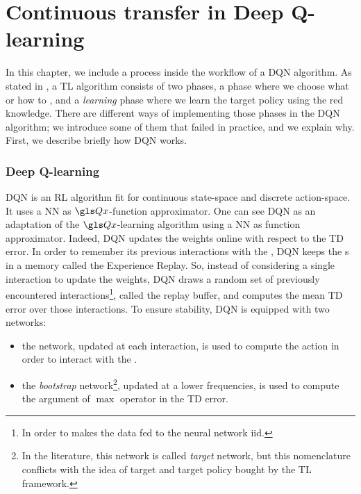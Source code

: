 
\chapter{Continuous transfer in Deep Q-learning}
\label{sec:continuous}

In this chapter, we include a  process inside the workflow of a \acrfull{DQN} algorithm. As stated in , a \acrfull{TL} algorithm consists of two phases, a \textit{} phase where we choose what or how to , and a \textit{learning} phase where we learn the target policy using the red knowledge. There are different ways of implementing those phases in the \gls{DQN} algorithm; we introduce some of them that failed in practice, and we explain why. First, we describe briefly how \gls{DQN} works.


\subsection{Deep Q-learning} \gls{DQN} is an  \acrfull{RL} algorithm fit for continuous state-space and discrete action-space. It uses a \acrfull{NN} as $\Q$-function approximator. One can see \gls{DQN} as an adaptation of the $\Q$-learning algorithm using a \gls{NN} as function approximator. Indeed, \gls{DQN} updates the weights online with respect to the \acrfull{TD} error. In order to remember its previous interactions with the , \gls{DQN} keeps the s in a memory called the Experience Replay. So, instead of considering a single interaction to update the weights, \gls{DQN} draws a random set of previously encountered interactions\footnote{In order to makes the data fed to the neural network \gls{iid}.}, called the replay buffer, and computes the mean \gls{TD} error over those interactions. To ensure stability, \gls{DQN} is equipped with two networks:

\begin{itemize}
    \item the \textit{} network, updated at each interaction, is used to compute the  action in order to interact with the .
    \item the \textit{bootstrap} network\footnote{In the literature, this network is called \textit{target} network, but this nomenclature conflicts with the idea of target  and target policy bought by the \gls{TL} framework.}, updated at a lower frequencies, is used to compute the argument of $\max$ operator in the \gls{TD} error.
\end{itemize}

